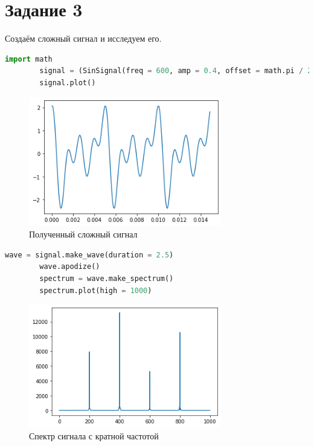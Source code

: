 \documentclass[a4paper, 12pt]{report}
\begin{document}
	\section{Задание 3}
	Создаём сложный сигнал и исследуем его.
	\begin{lstlisting}[language=Python,caption=Получение сложного сигнала через сумму других сигналов]
		import math
		signal = (SinSignal(freq = 600, amp = 0.4, offset = math.pi / 2) + CosSignal(freq = 200, amp = 0.6, offset = math.pi / 3) + SinSignal(freq = 800, amp = 0.8, offset = math.pi / 4) + CosSignal(freq = 400, amp = 1.0, offset = math.pi / 5))
		signal.plot()
	\end{lstlisting}
	\begin{figure}[H]
		\centering
		\includegraphics[width=0.75\textwidth]{sum.png}
		\caption{Полученный сложный сигнал}
		\label{fig:sum}
	\end{figure}
	\begin{lstlisting}[language=Python,caption=Спектр этого сигнала]
		wave = signal.make_wave(duration = 2.5)
		wave.apodize()
		spectrum = wave.make_spectrum()
		spectrum.plot(high = 1000)
	\end{lstlisting}
	\begin{figure}[H]
		\centering
		\includegraphics[width=0.75\textwidth]{spectrum7.png}
		\caption{Спектр сигнала с кратной частотой}
		\label{fig:spectrum7}
	\end{figure}
\end{document}
